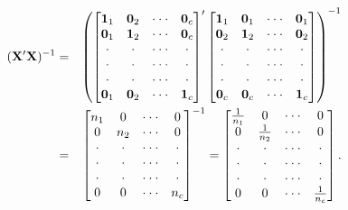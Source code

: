 \begin{center}
\begin{eqnarray}\label{E4:OneFactorXPrimeX}
(\mathbf{X^{\prime }X})^{-1} &=&\left(
\begin{bmatrix}
\mathbf{1}_1 & \mathbf{0}_2 & \cdot \cdot \cdot  & \mathbf{0}_c \\
\mathbf{0}_1 & \mathbf{1}_2 & \cdot \cdot \cdot  & \mathbf{0}_c \\
\cdot  & \cdot  & \cdot \cdot \cdot  & \cdot  \\
\cdot  & \cdot  & \cdot \cdot \cdot  & \cdot  \\
\cdot  & \cdot  & \cdot \cdot \cdot  & \cdot  \\
\mathbf{0}_{1} & \mathbf{0}_{2} & \cdot \cdot \cdot  & \mathbf{1}_c%
\end{bmatrix}^{\prime }%
\begin{bmatrix}
\mathbf{1}_1 & \mathbf{0}_1 & \cdot \cdot \cdot  & \mathbf{0}%
_{1} \\
\mathbf{0}_{2} & \mathbf{1}_2 & \cdot \cdot \cdot  & \mathbf{0}%
_{2} \\
\cdot  & \cdot  & \cdot \cdot \cdot  & \cdot  \\
\cdot  & \cdot  & \cdot \cdot \cdot  & \cdot  \\
\cdot  & \cdot  & \cdot \cdot \cdot  & \cdot  \\
\mathbf{0}_{c} & \mathbf{0}_{c} & \cdot \cdot \cdot  & \mathbf{1}_c
\end{bmatrix} \notag
\right) ^{-1} \\
&=&%
\begin{bmatrix}
n_1 & 0 & \cdot \cdot \cdot  & 0 \\
0 & n_2 & \cdot \cdot \cdot  & 0 \\
\cdot  & \cdot  & \cdot \cdot \cdot  & \cdot  \\
\cdot  & \cdot  & \cdot \cdot \cdot  & \cdot  \\
\cdot  & \cdot  & \cdot \cdot \cdot  & \cdot  \\
0 & 0 & \cdot \cdot \cdot  & n_c%
\end{bmatrix}%
^{-1}=%
\begin{bmatrix}
\frac{1}{n_1} & 0 & \cdot \cdot \cdot  & 0 \\
0 & \frac{1}{n_2} & \cdot \cdot \cdot  & 0 \\
\cdot  & \cdot  & \cdot \cdot \cdot  & \cdot  \\
\cdot  & \cdot  & \cdot \cdot \cdot  & \cdot  \\
\cdot  & \cdot  & \cdot \cdot \cdot  & \cdot  \\
0 & 0 & \cdot \cdot \cdot  & \frac{1}{n_c}
\end{bmatrix}%
.
\end{eqnarray}
\end{center}

